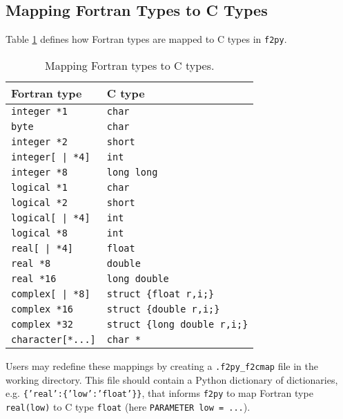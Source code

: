 \documentclass[twocolumn]{article}
\newcommand{\fpy}{\texttt{f2py}\xspace}
\begin{document}
\subsection{Mapping Fortran Types to C Types}
\label{sec:mapF2Ctypes}

Table \ref{tab:mapf2c} defines how Fortran types are mapped to C types
in \fpy.
\begin{table}[htb]
  \begin{center}
    \begin{tabular}[c]{l|l}
      Fortran type & C type \\\hline
      \texttt{integer *1} & \texttt{char}\\
      \texttt{byte} & \texttt{char}\\
      \texttt{integer *2} & \texttt{short}\\
      \texttt{integer[ | *4]} & \texttt{int}\\
      \texttt{integer *8} & \texttt{long long}\\
      \texttt{logical *1} & \texttt{char}\\
      \texttt{logical *2} & \texttt{short}\\
      \texttt{logical[ | *4]} & \texttt{int}\\
      \texttt{logical *8} & \texttt{int}\\
      \texttt{real[ | *4]} & \texttt{float}\\
      \texttt{real *8} & \texttt{double}\\
      \texttt{real *16} & \texttt{long double}\\
      \texttt{complex[ | *8]} & \texttt{struct \{float r,i;\}}\\
      \texttt{complex *16} & \texttt{struct \{double r,i;\}}\\
      \texttt{complex *32} & \texttt{struct \{long double r,i;\}}\\
      \texttt{character[*...]} & \texttt{char *}\\
    \end{tabular}
    \caption{Mapping Fortran types to C types.}
    \label{tab:mapf2c}
  \end{center}
\end{table}
Users may redefine these mappings by creating a \texttt{.f2py\_f2cmap}
file in the working directory. This file should contain a Python
dictionary of dictionaries, e.g. \texttt{\{'real':\{'low':'float'\}\}},
that informs \fpy to map Fortran type \texttt{real(low)}
to C type \texttt{float} (here \texttt{PARAMETER low = ...}).
\end{document}
